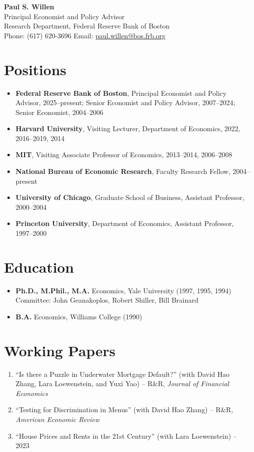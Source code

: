 \documentclass[11pt]{article}
\begin{document}
\begin{center}
{\LARGE \textbf{Paul S. Willen}}\\[6pt]
{\large Principal Economist and Policy Advisor}\\
Research Department, Federal Reserve Bank of Boston\\[6pt]
Phone: (617) 620-3696 \quad Email: \href{mailto:paul.willen@bos.frb.org}{paul.willen@bos.frb.org}
\end{center}

\section*{Positions}
\begin{itemize}[leftmargin=*, nosep]
\item \textbf{Federal Reserve Bank of Boston}, Principal Economist and Policy Advisor, 2025--present; Senior Economist and Policy Advisor, 2007--2024; Senior Economist, 2004--2006
\item \textbf{Harvard University}, Visiting Lecturer, Department of Economics, 2022, 2016--2019, 2014
\item \textbf{MIT}, Visiting Associate Professor of Economics, 2013--2014, 2006--2008
\item \textbf{National Bureau of Economic Research}, Faculty Research Fellow, 2004--present
\item \textbf{University of Chicago}, Graduate School of Business, Assistant Professor, 2000--2004
\item \textbf{Princeton University}, Department of Economics, Assistant Professor, 1997--2000
\end{itemize}

\section*{Education}
\begin{itemize}[leftmargin=*, nosep]
\item \textbf{Ph.D., M.Phil., M.A.} Economics, Yale University (1997, 1995, 1994)\\
Committee: John Geanakoplos, Robert Shiller, Bill Brainard
\item \textbf{B.A.} Economics, Williams College (1990)
\end{itemize}

\section*{Working Papers}
\begin{enumerate}[leftmargin=*, nosep]
\item ``Is there a Puzzle in Underwater Mortgage Default?'' (with David Hao Zhang, Lara Loewenstein, and Yuxi Yao) -- R\&R, \textit{Journal of Financial Economics}
\item ``Testing for Discrimination in Menus'' (with David Hao Zhang) -- R\&R, \textit{American Economic Review}
\item ``House Prices and Rents in the 21st Century'' (with Lara Loewenstein) -- 2023
\end{enumerate}
\end{document}
